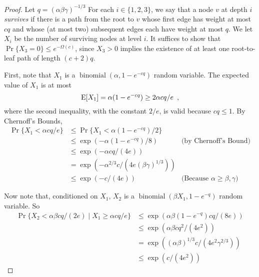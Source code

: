 \documentclass{patmorin}
\DeclareMathOperator{\binomial}{binomial}
\begin{document}
\begin{proof}
   Let $q=(\alpha\beta\gamma)^{-1/3}$
   For each $i\in\{1,2,3\}$, we say that a node $v$ at depth $i$
   \emph{survives} if there is a path from the root to $v$ whose
   first edge has weight at most $cq$
   and whose (at most two) subsequent edges each have weight at
   most $q$.  We let $X_i$ be the number of
   surviving nodes at level $i$.  It suffices to show that $\Pr\{X_3 =
   0\} \le e^{-\Omega(c)}$, since $X_3>0$ implies the existence of at
   least one root-to-leaf path of length $(c+2)q$.

   First, note that $X_1$ is a $\binomial(\alpha, 1-e^{-cq})$ random variable.
   The expected value of $X_1$ is at most
   \[
       \mathrm{E}[X_1] = \alpha(1-e^{-cq}) \ge 2\alpha cq/e \enspace ,
   \]
   where the second inequality, with the constant $2/e$, is valid because
   $cq\le 1$.
   By Chernoff's Bounds,
   \begin{align*}
     \Pr\{X_1 < \alpha cq/e\} 
       & \le \Pr\{X_1 < \alpha(1-e^{-cq})/2\} \\
       & \le \exp\left(-\alpha(1-e^{-cq})/8\right) & \text{(by Chernoff's Bound)}\\
       & \le \exp\left(-\alpha cq/(4e)\right) & \text{}\\
       & = \exp\left(-\alpha^{2/3}c/\left(4e(\beta\gamma)^{1/3}\right)\right) \\
       & \le \exp\left(-c/(4e)\right) & \text{(Because $\alpha \ge \beta,\gamma$)}
   \end{align*}

   Now note that, conditioned on $X_1$, $X_2$ is a
   $\binomial(\beta X_1,1-e^{-q})$ random variable.  So
   \begin{align*}
     \Pr\{X_2 < \alpha\beta cq/(2e) \mid X_1 \ge \alpha cq/e\}
       & \le \exp\left(\alpha\beta (1-e^{-q}) cq/(8e)\right) \\
       & \le \exp\left(\alpha\beta cq^2/(4e^2)\right) \\
       & = \exp\left((\alpha\beta)^{1/3} c/(4e^2\gamma^{2/3})\right) \\
       & \le \exp\left(c/(4e^2)\right)
   \end{align*}


\end{proof}
\end{document}

